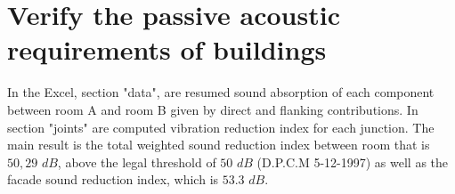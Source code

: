 \documentclass[]{scrartcl}
\begin{document}
\section{Verify the passive acoustic requirements of buildings}  

In the Excel, section "data", are resumed sound absorption of each component between room A and room B given by direct and flanking contributions. In section "joints" are computed  vibration reduction index for each junction. The main result is the total weighted sound reduction index between room that is  $50,29$ $dB$, above the legal threshold of $50$ $dB$ (D.P.C.M 5-12-1997) as well as the facade sound reduction index, which is $53.3$ $dB$. 
\end{document}
